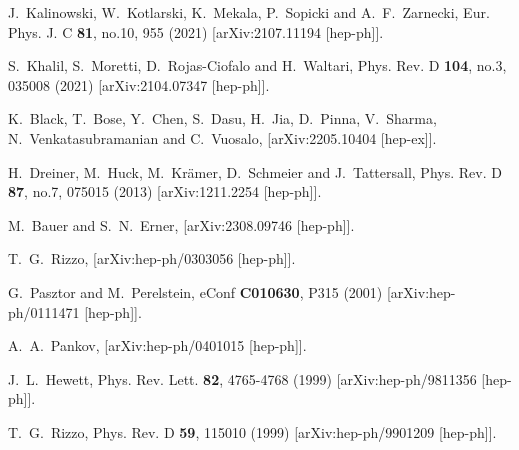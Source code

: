 \documentclass[14pt]{article}
\def\to{\rightarrow}
\begin{document}
{\begin{thebibliography}{99}
J.~Kalinowski, W.~Kotlarski, K.~Mekala, P.~Sopicki and A.~F.~Zarnecki,
Eur. Phys. J. C \textbf{81}, no.10, 955 (2021)
[arXiv:2107.11194 [hep-ph]].

S.~Khalil, S.~Moretti, D.~Rojas-Ciofalo and H.~Waltari,
Phys. Rev. D \textbf{104}, no.3, 035008 (2021)
[arXiv:2104.07347 [hep-ph]].

K.~Black, T.~Bose, Y.~Chen, S.~Dasu, H.~Jia, D.~Pinna, V.~Sharma, N.~Venkatasubramanian and C.~Vuosalo,
[arXiv:2205.10404 [hep-ex]].

H.~Dreiner, M.~Huck, M.~Kr\"amer, D.~Schmeier and J.~Tattersall,
Phys. Rev. D \textbf{87}, no.7, 075015 (2013)
[arXiv:1211.2254 [hep-ph]].

M.~Bauer and S.~N.~Erner,
[arXiv:2308.09746 [hep-ph]].

T.~G.~Rizzo,
[arXiv:hep-ph/0303056 [hep-ph]].

G.~Pasztor and M.~Perelstein,
eConf \textbf{C010630}, P315 (2001)
[arXiv:hep-ph/0111471 [hep-ph]].

A.~A.~Pankov,
[arXiv:hep-ph/0401015 [hep-ph]].


J.~L.~Hewett,
Phys. Rev. Lett. \textbf{82}, 4765-4768 (1999)
[arXiv:hep-ph/9811356 [hep-ph]].

T.~G.~Rizzo,
Phys. Rev. D \textbf{59}, 115010 (1999)
[arXiv:hep-ph/9901209 [hep-ph]].


\end{thebibliography}}
\end{document}
